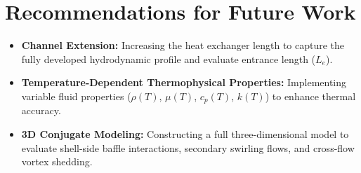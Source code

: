\documentclass[12pt,a4paper]{report}
\begin{document}
\section{Recommendations for Future Work}
\begin{itemize}
    \item \textbf{Channel Extension:} Increasing the heat exchanger length to capture the fully developed hydrodynamic profile and evaluate entrance length ($L_e$).
    \item \textbf{Temperature-Dependent Thermophysical Properties:} Implementing variable fluid properties ($\rho(T)$, $\mu(T)$, $c_p(T)$, $k(T)$) to enhance thermal accuracy.
    \item \textbf{3D Conjugate Modeling:} Constructing a full three-dimensional model to evaluate shell-side baffle interactions, secondary swirling flows, and cross-flow vortex shedding.
\end{itemize}
\end{document}
